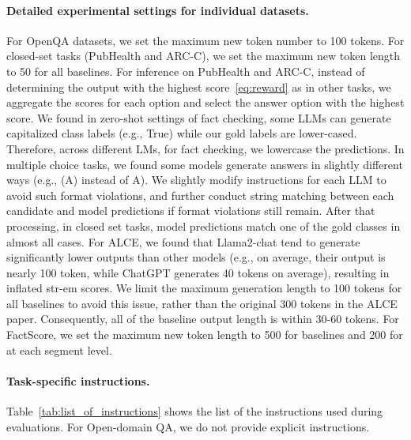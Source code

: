 \paragraph{Detailed experimental settings for individual datasets.}
For OpenQA datasets, we set the maximum new token number to 100 tokens. For closed-set tasks (PubHealth and ARC-C), we set the maximum new token length to 50 for all baselines. 
For \model inference on PubHealth and ARC-C, instead of determining the output with the highest score~\ref{eq:reward} as in other tasks, we aggregate the scores for each option and select the answer option with the highest score. 
We found in zero-shot settings of fact checking, some LLMs can generate capitalized class labels (e.g., True) while our gold labels are lower-cased. Therefore, across different LMs, for fact checking, we lowercase the predictions. 
In multiple choice tasks, we found some models generate answers in slightly different ways (e.g., (A) instead of A). We slightly modify instructions for each LLM to avoid such format violations, and further conduct string matching between each candidate and model predictions if format violations still remain. After that processing, in closed set tasks, model predictions match one of the gold classes in almost all cases. 
For ALCE, we found that Llama2-chat tend to generate significantly lower outputs than other models (e.g., on average, their output is nearly 100 token, while ChatGPT generates 40 tokens on average), resulting in inflated str-em scores. We limit the maximum generation length to 100 tokens for all baselines to avoid this issue, rather than the original 300 tokens in the ALCE paper. Consequently, all of the baseline output length is within 30-60 tokens. 
For FactScore, we set the maximum new token length to 500 for baselines and 200 for \model at each segment level. 

\paragraph{Task-specific instructions.} Table~\ref{tab:list_of_instructions} shows the list of the instructions used during evaluations. For Open-domain QA, we do not provide explicit instructions. 

